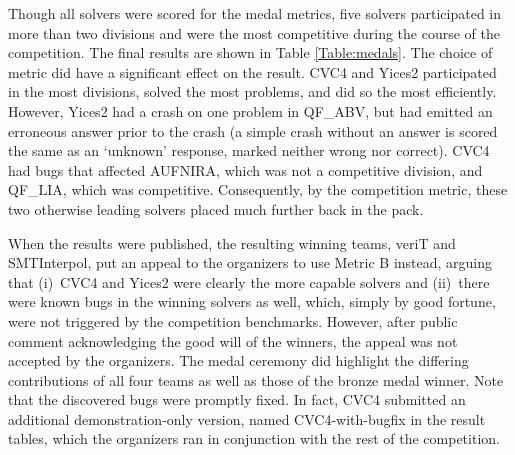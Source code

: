 \documentclass[twoside,11pt]{article}
\begin{document}
Though all solvers were scored for the medal metrics, five solvers participated in more than two divisions and were the most competitive during the course of the competition. The final results are shown in Table \ref{Table:medals}. The choice of metric did have a significant effect on the result. CVC4 and Yices2 participated in the most divisions, solved the most problems, and did so the most efficiently. However, Yices2 had a crash on one problem in QF\_ABV, but had emitted an erroneous answer prior to the crash (a simple crash without an answer is scored the same as an `unknown' response, marked neither wrong nor correct). CVC4 had bugs that affected AUFNIRA, which was not a competitive division, and QF\_LIA,
which was competitive. Consequently, by the competition metric, these two otherwise leading solvers placed much further back in the pack.

When the results were published, the resulting winning teams, veriT and SMTInterpol, put an appeal to the organizers to use Metric B instead, arguing that (i)~CVC4 and Yices2 were clearly the more capable solvers and (ii)~there were known bugs in the winning solvers as well, which, simply by good fortune, were not triggered by the competition benchmarks. However, after public comment acknowledging the good will of the winners, the appeal was not accepted by the organizers. The medal ceremony did highlight the differing contributions of all four teams as well as those of the bronze medal winner. Note that the discovered bugs were promptly fixed. In fact, CVC4 submitted an additional demonstration-only version, named CVC4-with-bugfix in the result tables, which the organizers ran in conjunction with the rest of the competition.
\end{document}
